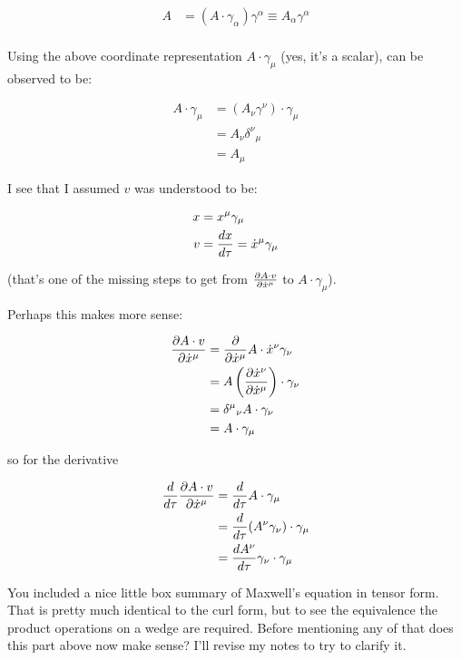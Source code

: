 \begin{align*}
A &= \left(A \cdot \gamma_\alpha\right) \gamma^\alpha \equiv A_\alpha \gamma^\alpha \\
\end{align*}

Using the above coordinate representation $A \cdot \gamma_\mu$ (yes, it's a scalar), can be observed to be:

\begin{align*}
A \cdot \gamma_\mu 
&= \left( A_\nu \gamma^\nu \right) \cdot \gamma_\mu \\
&= A_\nu {\delta^\nu}_\mu \\
&= A_\mu
\end{align*}

I see that I assumed $v$ was understood to be:

\begin{align*}
x &= x^\mu \gamma_\mu \\
v &= \frac{dx}{d\tau} = \xdot^\mu \gamma_\mu
\end{align*}

(that's one of the missing steps to get from $\PD{\xdot^\mu}{A \cdot v}$ to $A \cdot \gamma_\mu$).

Perhaps this makes more sense:

\begin{align*}
\PD{\xdot^\mu}{A \cdot v} 
&= \PD{\xdot^\mu}{} A \cdot \xdot^\nu \gamma_\nu \\
&= A \left( \PD{\xdot^\mu}{\xdot^\nu} \right) \cdot \gamma_\nu \\
&= {\delta^\mu}_\nu A \cdot \gamma_\nu \\
&= A \cdot \gamma_\mu \\
\end{align*}

so for the derivative

\begin{align*}
\frac{d}{d\tau} \PD{\xdot^\mu}{A \cdot v} 
&= \frac{d}{d\tau} A \cdot \gamma_\mu \\
&= \frac{d}{d\tau} (A^\nu \gamma_\nu) \cdot \gamma_\mu \\
&= \frac{dA^\nu}{d\tau} \gamma_\nu \cdot \gamma_\mu \\
\end{align*}

You included a nice little box summary of Maxwell's equation in tensor form.  That is pretty much identical to the curl
form, but to see the equivalence the product operations on a wedge are required.  Before mentioning any of that does this
part above now make sense?  I'll revise my notes to try to clarify it.


